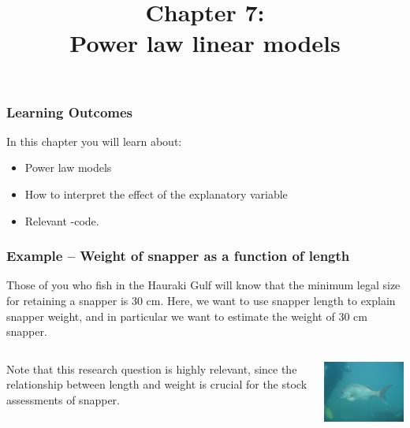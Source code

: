 \documentclass{beamer}\usepackage[]{graphicx}\usepackage[]{xcolor}
\begin{document}
\newcommand{\thechapter}{7}

\title{Chapter 7: \\ Power law linear models}


\begin{frame}
\titlepage
\end{frame}


\begin{frame}[t]
\frametitle{Learning Outcomes}
In this chapter you will learn about:
\begin{center}
\vspace{16pt}
\begin{minipage}{0.9\textwidth}
  \begin{itemize}
  \item Power law models 
  \item How to interpret the effect of the explanatory variable
  \item Relevant -code.
  \end{itemize}
\end{minipage}
\end{center}
\end{frame}




\begin{frame}
\frametitle{Example -- Weight of snapper as a function of length}

Those of you who fish in the Hauraki Gulf will know that the minimum legal size for
retaining a snapper is 30 cm.
Here, we want to use snapper length to explain snapper weight, and in particular
we want to estimate the weight of 30 cm snapper.

\begin{columns}
\begin{column}{0.45\textwidth}
Note that this research question is highly relevant, 
since the relationship between length and weight is crucial for the 
stock assessments of snapper.
\end{column}
\begin{column}{0.55\textwidth}
\includegraphics[width=2.5in]{SnapperAtLeigh.jpg}
\end{column}
\end{columns}
\end{frame}
\end{document}
